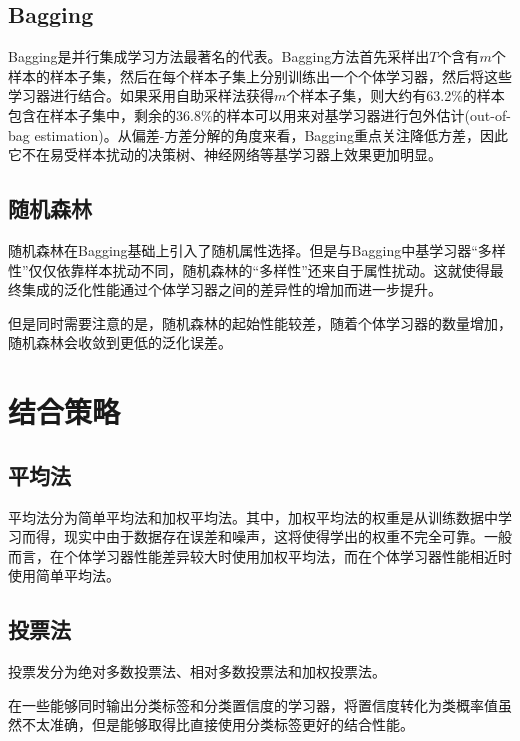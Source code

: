 \subsection{Bagging}

Bagging是并行集成学习方法最著名的代表。Bagging方法首先采样出$T$个含有$m$个样本的样本子集，然后在每个样本子集上分别训练出一个个体学习器，然后将这些学习器进行结合。如果采用自助采样法获得$m$个样本子集，则大约有63.2\%的样本包含在样本子集中，剩余的36.8\%的样本可以用来对基学习器进行包外估计(out-of-bag estimation)。从偏差-方差分解的角度来看，Bagging重点关注降低方差，因此它不在易受样本扰动的决策树、神经网络等基学习器上效果更加明显。

\subsection{随机森林}

随机森林在Bagging基础上引入了随机属性选择。但是与Bagging中基学习器“多样性”仅仅依靠样本扰动不同，随机森林的“多样性”还来自于属性扰动。这就使得最终集成的泛化性能通过个体学习器之间的差异性的增加而进一步提升。

但是同时需要注意的是，随机森林的起始性能较差，随着个体学习器的数量增加，随机森林会收敛到更低的泛化误差。

\section{结合策略}

\subsection{平均法}

平均法分为简单平均法和加权平均法。其中，加权平均法的权重是从训练数据中学习而得，现实中由于数据存在误差和噪声，这将使得学出的权重不完全可靠。一般而言，在个体学习器性能差异较大时使用加权平均法，而在个体学习器性能相近时使用简单平均法。

\subsection{投票法}

投票发分为绝对多数投票法、相对多数投票法和加权投票法。

在一些能够同时输出分类标签和分类置信度的学习器，将置信度转化为类概率值虽然不太准确，但是能够取得比直接使用分类标签更好的结合性能。

